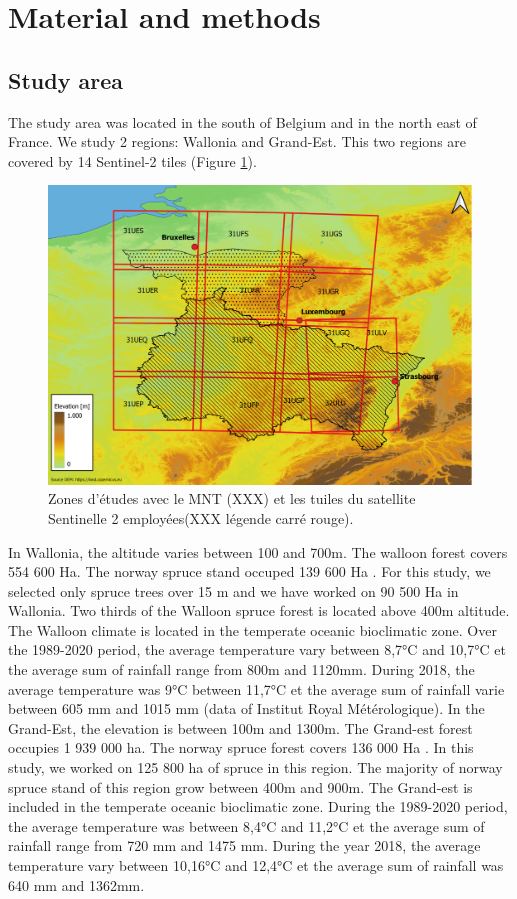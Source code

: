 \documentclass[3p,procedia]{elsarticle}
\begin{document}
\section{Material and methods}
\subsection{Study area}
The study area was located in the south of Belgium and in the north east of France. We study 2 regions: Wallonia and Grand-Est. This two regions are covered by 14 Sentinel-2 tiles (Figure \ref{fig:situ}).
\begin{figure} [htbp] 
	\centering
	\includegraphics[width=1\textwidth]{gde_LO.png}
	\caption{Zones d'études avec le MNT (XXX) et les tuiles du satellite Sentinelle 2 employées(XXX légende carré rouge).}
	\label{fig:situ}
\end{figure}
In Wallonia, the altitude varies between 100 and 700m. The walloon forest covers 554 600 Ha. The norway spruce stand occuped 139 600 Ha \citep{Alderweireld_2015}. For this study, we selected only spruce trees over 15 m and we have worked on 90 500 Ha in Wallonia. Two thirds of the Walloon spruce forest is located above 400m altitude. The Walloon climate is located in the temperate oceanic bioclimatic zone\citep{lindner_climate_2010}. Over the 1989-2020 period, the average temperature vary between 8,7°C and 10,7°C et the average sum of rainfall range from 800m and 1120mm. During 2018, the average temperature was 9°C between 11,7°C et the average sum of rainfall varie between 605 mm and 1015 mm (data of Institut Royal Métérologique).%
 In the Grand-Est, the elevation is between 100m and 1300m. The Grand-est forest occupies 1 939 000 ha. The norway spruce forest covers 136 000 Ha \citep{IGN2022}. In this study, we worked on 125 800 ha of spruce in this region. The majority of norway spruce stand of this region grow between 400m and 900m. The Grand-est is included in the temperate oceanic bioclimatic zone\citep{lindner_climate_2010}. During the 1989-2020 period, the average temperature was between  8,4°C and 11,2°C et the average sum of rainfall range from 720 mm and 1475 mm. During the year 2018, the average temperature vary between 10,16°C and 12,4°C et the average sum of rainfall was 640 mm and 1362mm.
\end{document}
